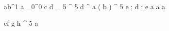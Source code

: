\begin{eqcode}{a}{b}{^1}{}
  a \gets {}_0^0 \lend
  c \gets d _ 5 ^ 5 \lend
  d \gets \genar \limits ^ { a } ( b ) ^ 5 \lend
  e ; d ; e  \lend
  a \gets {} \lend
  a \gets {} \lend
  a \gets {} \lend
\end{eqcode}


\begin{eqcode}{e}{f}{}{}
  g \gets h ^ 5 \lend
  a  \lend
\end{eqcode}
